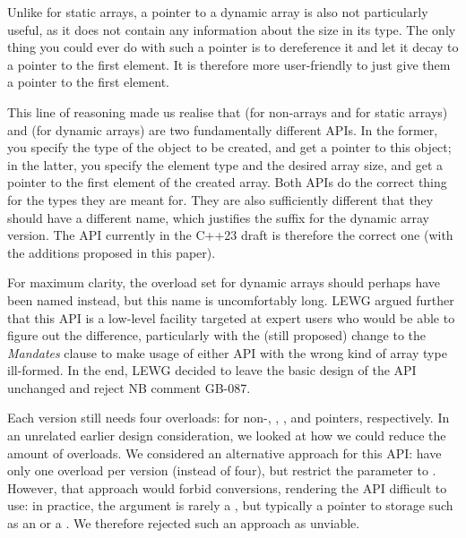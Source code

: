 Unlike for static arrays, a pointer to a dynamic array is also not particularly useful, as it does not contain any information about the size in its type. The only thing you could ever do with such a pointer is to dereference it and let it decay to a pointer to the first element. It is therefore more user-friendly to just give them a pointer to the first element.

This line of reasoning made us realise that \mbox{} (for non-arrays and for static arrays) and \mbox{} (for dynamic arrays) are two fundamentally different APIs. In the former, you specify the type of the object to be created, and get a pointer to this object; in the latter, you specify the element type and the desired array size, and get a pointer to the first element of the created array. Both APIs do the correct thing for the types they are meant for. They are also sufficiently different that they should have a different name, which justifies the  suffix for the dynamic array version. The API currently in the C++23 draft is therefore the correct one (with the additions proposed in this paper).

For maximum clarity, the overload set for dynamic arrays should perhaps have been named \mbox{} instead, but this name is uncomfortably long. LEWG argued further that this API is a low-level facility targeted at expert users who would be able to figure out the difference, particularly with the (still proposed) change to the \emph{Mandates} clause to make usage of either API with the wrong kind of array type ill-formed. In the end, LEWG decided to leave the basic design of the API unchanged and reject NB comment GB-087.

Each version still needs four overloads: for non-, , , and  pointers, respectively. In an unrelated earlier design consideration, we looked at how we could reduce the amount of overloads. We considered an alternative approach for this API: have only one overload per version (instead of four), but restrict the parameter to . However, that approach would forbid conversions, rendering the API difficult to use: in practice, the argument is rarely a , but typically a pointer to storage such as an  or a . We therefore rejected such an approach as unviable.

\pagebreak %

